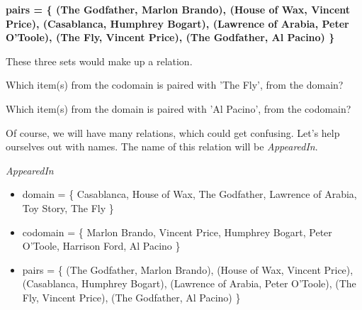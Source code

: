 \documentclass{ximera}
\begin{document}
\begin{center} 
\textbf{\textcolor{red!25!blue!75!}{ pairs = \{ (The Godfather, Marlon Brando), (House of Wax, Vincent Price), (Casablanca, Humphrey Bogart), (Lawrence of Arabia, Peter O'Toole), (The Fly, Vincent Price), (The Godfather, Al Pacino) \}  }}
\end{center}


These three sets would make up a relation. 



\begin{question}

Which item(s) from the codomain is paired with 'The Fly', from the domain?
\begin{multipleChoice}
\end{multipleChoice}

\end{question}



\begin{question}

Which item(s) from the domain is paired with 'Al Pacino', from the codomain?
\begin{multipleChoice}
\end{multipleChoice}

\end{question}






Of course, we will have many relations, which could get confusing.  Let's help ourselves out with names.  The name of this relation will be \textit{AppearedIn}.


\begin{example} \textit{AppearedIn} \\
\begin{itemize}
\item domain = \{ Casablanca, House of Wax,  The Godfather, Lawrence of Arabia, Toy Story, The Fly \}  
\item codomain = \{ Marlon Brando, Vincent Price, Humphrey Bogart, Peter O'Toole, Harrison Ford, Al Pacino  \} 
\item pairs = \{ (The Godfather, Marlon Brando), (House of Wax, Vincent Price), (Casablanca, Humphrey Bogart), (Lawrence of Arabia, Peter O'Toole), (The Fly, Vincent Price), (The Godfather, Al Pacino) \} 
\end{itemize}
\end{example}
\end{document}
